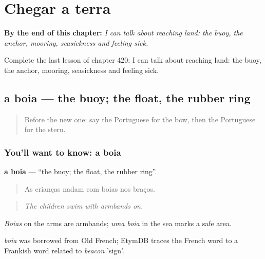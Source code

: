 
\chapter{Chegar a terra}
\label{ch:pt-chegar-a-terra}

\begin{chapteropening}
\textbf{By the end of this chapter:} \emph{I can talk about reaching land: the buoy, the anchor, mooring, seasickness and feeling sick.}

Complete the last lesson of chapter 420: I can talk about reaching land: the buoy, the anchor, mooring, seasickness and feeling sick.
\end{chapteropening}

\section[a boia]{a boia — the buoy; the float, the rubber ring}

\label{lesson:PT-C420-boia}



\begin{quote}
Before the new one: say the Portuguese for the bow, then the Portuguese for the stern.
\end{quote}

\subsection*{You'll want to know: a boia}
\textbf{a boia} — \textquotedblleft{}the buoy; the float, the rubber ring\textquotedblright{}.

\begin{quote}
As crianças nadam com boias nos braços.
\end{quote}

\begin{quote}
\emph{The children swim with armbands on.}
\end{quote}

\emph{Boias} on the arms are armbands; \emph{uma boia} in the sea marks a safe area.

\begin{cousinweb}
\emph{boia} was borrowed from Old French; EtymDB traces the French word to a Frankish word related to \emph{beacon} 'sign'.
\end{cousinweb}

